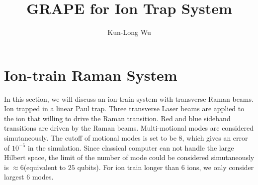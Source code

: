\documentclass{simple-notes}
\title{GRAPE for Ion Trap System}
\author{Kun-Long Wu}
\begin{document}
\section{Ion-train Raman System}
In this section, we will discuss an ion-train system with transverse Raman beams. Ion trapped in a linear Paul trap. Three transverse Laser beams are applied to the ion that willing to drive the Raman transition. Red and blue sideband transitions are driven by the Raman beams. Multi-motional modes are considered simutaneously. The cutoff of motional modes is set to be $8$, which gives an error of $10^{-5}$ in the simulation. Since classical computer can not handle the large Hilbert space, the limit of the number of mode could be considered simutaneously is $\approx 6$(equivalent to $25$ qubits). For ion train longer than $6$ ions, we only consider largest $6$ modes. 
\newpage
\end{document}
